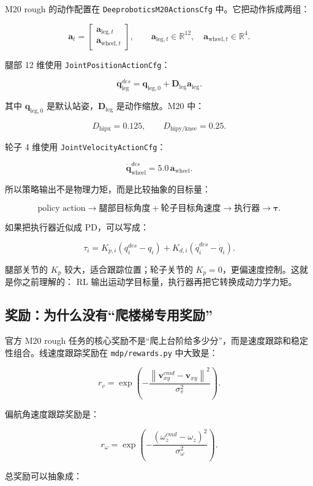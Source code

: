 \documentclass[UTF8,11pt,a4paper]{ctexart}
\newcommand{\R}{\mathbb{R}}
\newcommand{\bs}[1]{\bm{#1}}
\begin{document}
M20 rough 的动作配置在 \texttt{DeeproboticsM20ActionsCfg} 中。它把动作拆成两组：

\[
\bs a_t=
\begin{bmatrix}
\bs a_{\mathrm{leg},t}\\
\bs a_{\mathrm{wheel},t}
\end{bmatrix},
\qquad
\bs a_{\mathrm{leg},t}\in\R^{12},\quad
\bs a_{\mathrm{wheel},t}\in\R^4.
\]

腿部 12 维使用 \texttt{JointPositionActionCfg}：

\[
\boxed{
\bs q_{\mathrm{leg}}^{des}
=
\bs q_{\mathrm{leg},0}
+
\bs D_{\mathrm{leg}}\bs a_{\mathrm{leg}}.
}
\]

其中 \(\bs q_{\mathrm{leg},0}\) 是默认站姿，\(\bs D_{\mathrm{leg}}\) 是动作缩放。M20 中：

\[
D_{\mathrm{hipx}}=0.125,\qquad
D_{\mathrm{hipy/knee}}=0.25.
\]

轮子 4 维使用 \texttt{JointVelocityActionCfg}：

\[
\boxed{
\dot{\bs q}_{\mathrm{wheel}}^{des}
=
5.0\,\bs a_{\mathrm{wheel}}.
}
\]

所以策略输出不是物理力矩，而是比较抽象的目标量：

\[
\boxed{
\text{policy action}
\rightarrow
\text{腿部目标角度}
+
\text{轮子目标角速度}
\rightarrow
\text{执行器}
\rightarrow
\bs\tau.
}
\]

如果把执行器近似成 PD，可以写成：

\[
\boxed{
\tau_i
=
K_{p,i}(q_i^{des}-q_i)
+
K_{d,i}(\dot q_i^{des}-\dot q_i).
}
\]

腿部关节的 \(K_p\) 较大，适合跟踪位置；轮子关节的 \(K_p=0\)，更偏速度控制。这就是你之前理解的：
RL 输出运动学目标量，执行器再把它转换成动力学力矩。

\subsection{奖励：为什么没有“爬楼梯专用奖励”}

官方 M20 rough 任务的核心奖励不是“爬上台阶给多少分”，而是速度跟踪和稳定性组合。线速度跟踪奖励在
\texttt{mdp/rewards.py} 中大致是：

\[
\boxed{
r_v
=
\exp\left(
-
\frac{
\left\|
\bs v_{xy}^{cmd}-\bs v_{xy}
\right\|^2
}{\sigma_v^2}
\right).
}
\]

偏航角速度跟踪奖励是：

\[
\boxed{
r_\omega
=
\exp\left(
-
\frac{
(\omega_z^{cmd}-\omega_z)^2
}{\sigma_\omega^2}
\right).
}
\]

总奖励可以抽象成：
\end{document}
